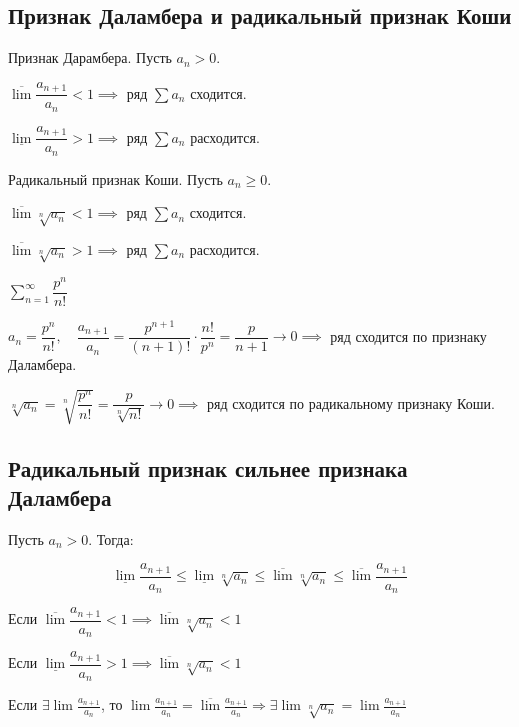 \subsection{Признак Даламбера и радикальный признак Коши}

\begin{theorem}
Признак Дарамбера. Пусть $a_n > 0$.

$\overline{\lim} \dfrac{a_{n+1}}{a_n} < 1 \implies $ ряд $\sum a_n$ сходится.

$\underline{\lim} \dfrac{a_{n+1}}{a_n} > 1 \implies $ ряд $\sum a_n$ расходится.
\end{theorem}

\begin{theorem}
Радикальный признак Коши. Пусть $a_n \geq 0$.

 $\overline{\lim} \sqrt[n]{a_n} < 1 \implies$ ряд $\sum a_n$ сходится.
 
  $\overline{\lim} \sqrt[n]{a_n} > 1 \implies$ ряд $\sum a_n$ расходится.
\end{theorem}

\begin{example}
$\sum_{n=1}^{\infty} \dfrac{p^{n}}{n!}$

$a_n = \dfrac{p^n}{n!},\quad \dfrac{a_{n+1}}{a_n} = \dfrac{p^{n+1}}{(n+1)!} \cdot \dfrac{n!}{p^n} = \dfrac{p}{n + 1} \to 0 \implies $ ряд сходится по признаку Даламбера.

$\sqrt[n]{a_n} = \sqrt[n]{\dfrac{p^n}{n!}} = \dfrac{p}{\sqrt[n]{n!}} \to 0 \implies$ ряд сходится по радикальному признаку Коши.
\end{example}

\subsection{Радикальный признак сильнее признака Даламбера}

Пусть $a_n > 0$. Тогда:

$$ \underline{\lim} \dfrac{a_{n+1}}{a_n} \leq \underline{\lim}{\sqrt[n]{a_n}} \leq \overline{\lim}{\sqrt[n]{a_n}} \leq \overline{\lim}\dfrac{a_{n+1}}{a_n}$$

Если $\overline{\lim}\dfrac{a_{n+1}}{a_n} < 1 \implies \overline{\lim}{\sqrt[n]{a_n}} < 1$

Если $\underline{\lim}\dfrac{a_{n+1}}{a_n} > 1 \implies \overline{\lim}{\sqrt[n]{a_n}} < 1$

Если $\exists \lim \frac{a_{n+1}}{a_n}$, то $\lim \frac{a_{n+1}}{a_n} = \overline{\lim} \frac{a_{n+1}}{a_n} \Rightarrow \exists \lim \sqrt[n]{a_n} = \lim \frac{a_{n+1}}{a_n}$

